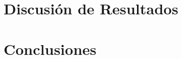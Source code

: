 \documentclass[osajnl,twocolumn,showpacs,superscriptaddress,10pt]{revtex4-1}
\begin{document}




\section{Discusión de Resultados}

    



\section{Conclusiones}






\end{document}
